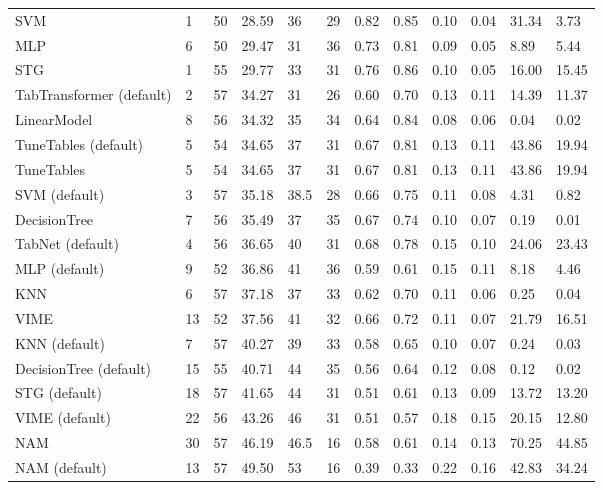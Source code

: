 \begin{tabular}{lllllrllllll}
SVM & 1 & 50 & 28.59 & 36 & 29 & 0.82 & 0.85 & 0.10 & 0.04 & 31.34 & 3.73 \\
MLP & 6 & 50 & 29.47 & 31 & 36 & 0.73 & 0.81 & 0.09 & 0.05 & 8.89 & 5.44 \\
STG & 1 & 55 & 29.77 & 33 & 31 & 0.76 & 0.86 & 0.10 & 0.05 & 16.00 & 15.45 \\
TabTransformer (default) & 2 & 57 & 34.27 & 31 & 26 & 0.60 & 0.70 & 0.13 & 0.11 & 14.39 & 11.37 \\
LinearModel & 8 & 56 & 34.32 & 35 & 34 & 0.64 & 0.84 & 0.08 & 0.06 & 0.04 & 0.02 \\
TuneTables (default) & 5 & 54 & 34.65 & 37 & 31 & 0.67 & 0.81 & 0.13 & 0.11 & 43.86 & 19.94 \\
TuneTables & 5 & 54 & 34.65 & 37 & 31 & 0.67 & 0.81 & 0.13 & 0.11 & 43.86 & 19.94 \\
SVM (default) & 3 & 57 & 35.18 & 38.5 & 28 & 0.66 & 0.75 & 0.11 & 0.08 & 4.31 & 0.82 \\
DecisionTree & 7 & 56 & 35.49 & 37 & 35 & 0.67 & 0.74 & 0.10 & 0.07 & 0.19 & 0.01 \\
TabNet (default) & 4 & 56 & 36.65 & 40 & 31 & 0.68 & 0.78 & 0.15 & 0.10 & 24.06 & 23.43 \\
MLP (default) & 9 & 52 & 36.86 & 41 & 36 & 0.59 & 0.61 & 0.15 & 0.11 & 8.18 & 4.46 \\
KNN & 6 & 57 & 37.18 & 37 & 33 & 0.62 & 0.70 & 0.11 & 0.06 & 0.25 & 0.04 \\
VIME & 13 & 52 & 37.56 & 41 & 32 & 0.66 & 0.72 & 0.11 & 0.07 & 21.79 & 16.51 \\
KNN (default) & 7 & 57 & 40.27 & 39 & 33 & 0.58 & 0.65 & 0.10 & 0.07 & 0.24 & 0.03 \\
DecisionTree (default) & 15 & 55 & 40.71 & 44 & 35 & 0.56 & 0.64 & 0.12 & 0.08 & 0.12 & 0.02 \\
STG (default) & 18 & 57 & 41.65 & 44 & 31 & 0.51 & 0.61 & 0.13 & 0.09 & 13.72 & 13.20 \\
VIME (default) & 22 & 56 & 43.26 & 46 & 31 & 0.51 & 0.57 & 0.18 & 0.15 & 20.15 & 12.80 \\
NAM & 30 & 57 & 46.19 & 46.5 & 16 & 0.58 & 0.61 & 0.14 & 0.13 & 70.25 & 44.85 \\
NAM (default) & 13 & 57 & 49.50 & 53 & 16 & 0.39 & 0.33 & 0.22 & 0.16 & 42.83 & 34.24 \\
\bottomrule
\end{tabular}
